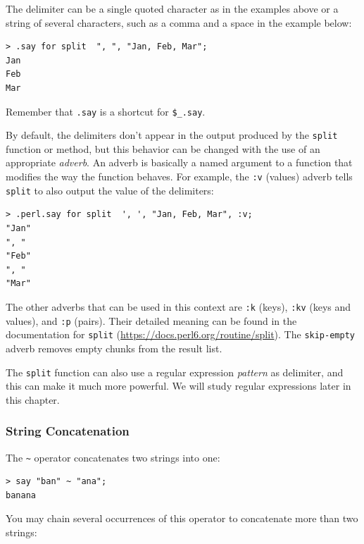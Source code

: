 The delimiter can be a single quoted character as in the 
examples above or a string of several characters, such as 
a comma and a space in the example below:

\begin{verbatim}
> .say for split  ", ", "Jan, Feb, Mar";
Jan
Feb
Mar
\end{verbatim}

Remember that \verb'.say' is a shortcut for \verb'$_.say'.

By default, the delimiters don't appear in the output produced 
by the {\tt split} function or method, but this behavior can 
be changed with the use of an appropriate \emph{adverb}. An adverb 
is basically a named argument to a function that modifies 
the way the function behaves. For example, the {\tt :v} (values) adverb 
tells {\tt split} to also output the value of the delimiters:

\begin{verbatim}
> .perl.say for split  ', ', "Jan, Feb, Mar", :v;
"Jan"
", "
"Feb"
", "
"Mar"
\end{verbatim}

The other adverbs that can be used in this context are 
{\tt :k} (keys), {\tt :kv} (keys and values), and {\tt :p} 
(pairs). Their detailed meaning can be 
found in the documentation for {\tt split} 
(\url{https://docs.perl6.org/routine/split}). The 
{\tt skip-empty} adverb removes empty chunks from the result 
list.

The {\tt split} function can also use a regular expression 
\emph{pattern} as delimiter, and this can make it much more powerful. 
We will study regular expressions later in this chapter.

\subsubsection{String Concatenation}


The \verb'~' operator concatenates two strings into one:

\begin{verbatim}
> say "ban" ~ "ana";
banana
\end{verbatim}
%

You may chain several occurrences of this operator to 
concatenate more than two strings:

